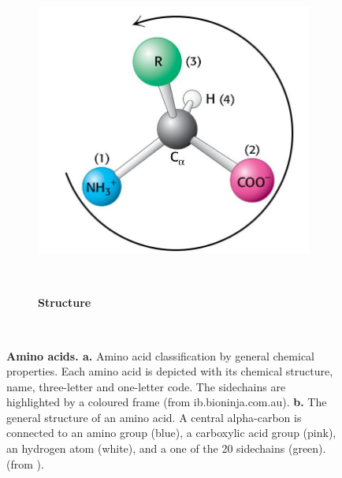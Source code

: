 \begin{figure}[h!]
\begin{subfigure}[b]{0.25\linewidth}
		\includegraphics[width=\linewidth]{./literature_review/proteins/amino_acids/img/structure.jpg}
		\caption{\textbf{Structure}}
	~\end{subfigure}
	\caption{
		\textbf{Amino acids. a.}
	Amino acid classification by general chemical properties. 
	Each amino acid is depicted with its chemical structure, name, three-letter and one-letter code. 
	The sidechains are highlighted by a coloured frame 
	(from ib.bioninja.com.au).
		\textbf{b.}
	The general structure of an amino acid. 
	A central alpha-carbon is connected to 
	an amino group (blue),
	a carboxylic acid group (pink),
	an hydrogen atom (white),
	and a one of the 20 sidechains (green).
	(from \cite{berg2015}).
	}
	\label{fig:amino_acids}
~\end{figure}
